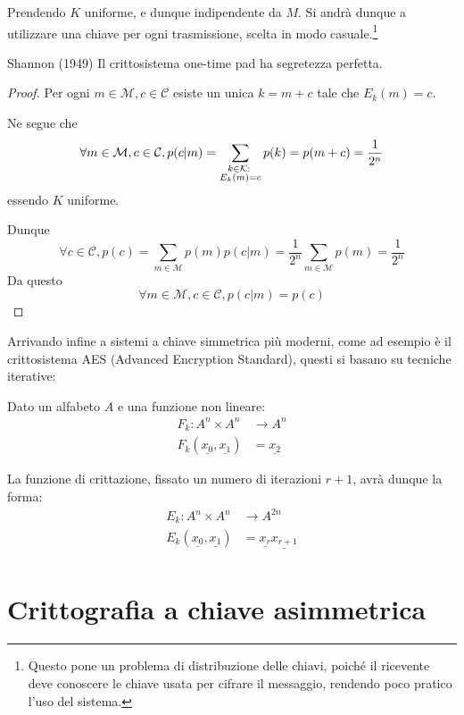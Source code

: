 Prendendo \(K\) uniforme, e dunque indipendente da \(M\). Si andrà dunque a utilizzare una chiave per ogni trasmissione, scelta in modo casuale.\footnote{
  Questo pone un problema di distribuzione delle chiavi, poiché il ricevente deve conoscere le chiave usata per cifrare il messaggio, rendendo poco pratico l'uso del sistema.}

\begin{theorem}{Shannon (1949)}
  Il crittosistema one-time pad ha segretezza perfetta.
\end{theorem}

\begin{proof}
  Per ogni \(m \in \mathcal{M}, c \in \mathcal{C}\) esiste un unica \(k = m+c\)  tale che \(E_k(m) = c\).

  Ne segue che 
  \[\forall m \in \mathcal{M}, c \in \mathcal{C}, p(c|m) = \sum_{\substack{k \in \mathcal{K} :\;\\ E_k(m)=c}} p(k) = p(m+c) = \frac{1}{2^n}\]
  essendo \(K\) uniforme.

  Dunque 
  \[\forall c \in \mathcal{C}, p(c) = \sum_{m \in \mathcal{M}} p(m) p(c|m) = \frac{1}{2^n}\sum_{m \in \mathcal{M}} p(m) = \frac{1}{2^n}\]
  Da questo
  \[\forall m \in \mathcal{M}, c \in \mathcal{C}, p(c|m) = p(c)\]
\end{proof}

Arrivando infine a sistemi a chiave simmetrica più moderni, come ad esempio è il crittosistema AES (Advanced Encryption Standard), questi si basano su tecniche iterative:

Dato un alfabeto \(A\) e una funzione non lineare:
\[\begin{aligned}
  F_k: A^n\times A^n &\to A^n\\
  F_k(\underline{x_0}, \underline{x_1}) &= \underline{x_2}
\end{aligned}\]

La funzione di crittazione, fissato un numero di iterazioni \(r+1\), avrà dunque la forma:
\[\begin{aligned}
  E_k: A^n\times A^n &\to A^{2n}\\
  E_k(\underline{x_0}, \underline{x_1}) &= \underline{x_r}\underline{x_{r+1}}\\
\end{aligned}
\]

\section{Crittografia a chiave asimmetrica}

